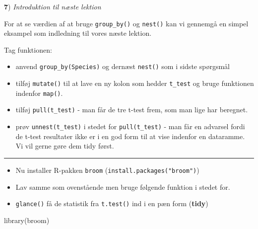 \documentclass[
]{book}
\newenvironment{Shaded}{\begin{snugshade}}{\end{snugshade}}
\newcommand{\ErrorTok}[1]{\textcolor[rgb]{0.64,0.00,0.00}{\textbf{#1}}}
\newcommand{\FunctionTok}[1]{\textcolor[rgb]{0.00,0.00,0.00}{#1}}
\newcommand{\NormalTok}[1]{#1}
\newcommand{\OtherTok}[1]{\textcolor[rgb]{0.56,0.35,0.01}{#1}}
\newcommand{\SpecialCharTok}[1]{\textcolor[rgb]{0.00,0.00,0.00}{#1}}
\providecommand{\tightlist}{%
  \setlength{\itemsep}{0pt}\setlength{\parskip}{0pt}}
\begin{document}
\textbf{7}) \emph{Introduktion til næste lektion}

For at se værdien af at bruge \texttt{group\_by()} og \texttt{nest()} kan vi gennemgå en simpel eksampel som indledning til vores næste lektion.

Tag funktionen:

\begin{Shaded}
\end{Shaded}

\begin{itemize}
\tightlist
\item
  anvend \texttt{group\_by(Species)} og dernæst \texttt{nest()} som i sidste spørgsmål
\item
  tilføj \texttt{mutate()} til at lave en ny kolon som hedder \texttt{t\_test} og bruge funktionen indenfor \texttt{map()}.
\item
  tilføj \texttt{pull(t\_test)} - man får de tre t-test frem, som man lige har beregnet.
\item
  prøv \texttt{unnest(t\_test)} i stedet for \texttt{pull(t\_test)} - man får en advarsel fordi de t-test resultater ikke er i en god form til at vise indenfor en dataramme. Vi vil gerne gøre dem tidy først.
\end{itemize}

\begin{center}\rule{0.5\linewidth}{0.5pt}\end{center}

\begin{itemize}
\tightlist
\item
  Nu installer R-pakken \texttt{broom} (\texttt{install.packages("broom")})
\item
  Lav samme som ovenstående men bruge følgende funktion i stedet for.
\item
  \texttt{glance()} få de statistik fra \texttt{t.test()} ind i en pæn form (\textbf{tidy})
\end{itemize}

\begin{Shaded}
\begin{Highlighting}[]
\FunctionTok{library}\NormalTok{(broom)}
\end{Highlighting}
\end{Shaded}
\end{document}
